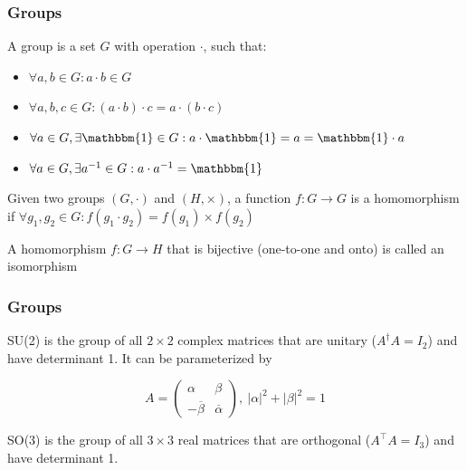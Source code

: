 \documentclass{beamer}
\begin{document}
\begin{frame}
\frametitle{Groups}
\begin{definition}[Groups]
A group is a set $G$ with operation $\cdot$, such that:

\begin{itemize}
	\item $\forall a, b \in G: a \cdot b \in G$
	\item $\forall a, b, c \in G: (a \cdot b) \cdot c = a \cdot (b \cdot c)$
	\item $\forall a \in G, \exists \mathbbm{1} \in G: a \cdot \mathbbm{1} = a = \mathbbm{1} \cdot a$
	\item $\forall a \in G, \exists a^{-1} \in G: a \cdot a^{-1} = \mathbbm{1}$
\end{itemize}
\end{definition}

\begin{definition}
Given two groups $(G, \cdot)$ and $(H, \times)$, a function $f: G \to G$ is a homomorphism if $\forall g_1, g_2 \in G: f(g_1 \cdot g_2) = f(g_1) \times f(g_2)$
\end{definition}

\begin{definition}
	A homomorphism $f: G \to H$ that is bijective (one-to-one and onto) is called an isomorphism
\end{definition}

\end{frame}

\begin{frame}
\frametitle{Groups}
\begin{definition}
SU(2) is the group of all $2 \times 2$ complex matrices that are unitary ($A^\dagger A = I_2$) and have determinant 1. It can be parameterized by

$$
A = 
\begin{pmatrix}
      \alpha       & \beta \\
		- \overline{\beta}       & \overline{\alpha}
\end{pmatrix} ,\ |\alpha| ^ 2 + |\beta| ^ 2 = 1
$$
\end{definition}

\begin{definition}
SO(3) is the group of all $3 \times 3$ real matrices that are orthogonal ($A^\top A = I_3$) and have determinant 1.
\end{definition}
\end{frame}
\end{document}
